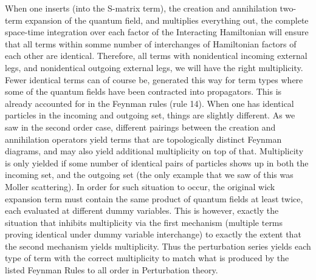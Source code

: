 \documentclass[a4]{article}
\begin{document}
    When one inserts (into the S-matrix term), the creation and annihilation two-term expansion of the quantum field, and multiplies everything out,
    the complete space-time integration over each factor of the Interacting Hamiltonian will ensure that all terms within somme number of interchanges
    of Hamiltonian factors of each other are identical. Therefore, all terms with nonidentical incoming external legs, and nonidentical outgoing external
    legs, we will have the right multiplicity. Fewer identical terms can of course be,  generated this way for term types where some of the quantum fields
    have been contracted into propagators. This is already accounted for in the Feynman rules (rule 14). When one has identical particles in the incoming
    and outgoing set, things are slightly different. As we saw in the second order case, different pairings between the creation and annihilation operators
    yield terms that are topologically distinct Feynman diagrams, and may also yield additional multiplicity on top of that. Multiplicity is only yielded
    if some number of identical pairs of particles shows up in both the incoming set, and the outgoing set (the only example that we saw of this was Moller
    scattering). In order for such situation to occur, the original wick expansion term must contain the same product of quantum fields at least twice,
    each evaluated at different dummy variables. This is however, exactly the situation that inhibits multiplicity via the first mechanism (multiple terms
    proving identical under dummy variable interchange) to exactly the extent that the second mechanism yields multiplicity. Thus the perturbation series
    yields each type of term with the correct multiplicity to match what is produced by the listed Feynman Rules to all order in Perturbation theory.   
\end{document}
